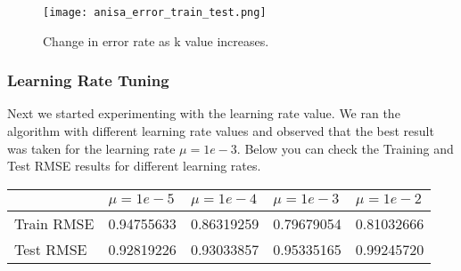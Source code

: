 \documentclass[a4paper]{article}
\begin{document}
\begin{figure}
\centering
\texttt{[image: anisa\_error\_train\_test.png]}
\vspace*{-15mm}
\caption{\label{fig:k_train_test}Change in error rate as k value increases.}
\end{figure}

\subsubsection*{Learning Rate Tuning}
Next we started experimenting with the learning rate value. We ran the algorithm with different learning rate values and observed that the best result was taken for the learning rate $\mu = 1e-3$. Below you can check the Training and Test RMSE results for different learning rates.
\begin{center}
    \begin{tabular}{| l | l | l | l |l|}
    \hline
     & $\mu = 1e-5$ & $\mu = 1e-4$ & $\mu = 1e-3$ & $\mu = 1e-2$ \\ \hline
    Train RMSE & 0.94755633 & 0.86319259 & 0.79679054 & 0.81032666 \\ \hline
    Test RMSE & 0.92819226 & 0.93033857 & 0.95335165 & 0.99245720 \\ \hline
    \hline
    \end{tabular}
\end{center}
\end{document}
